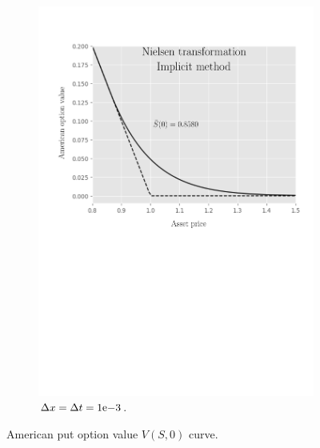 \begin{figure}[tbp]
\begin{subfigure}{0.4\textwidth}
    \includegraphics[width=\textwidth]{chapters/chapter3/TestCase3ImplictNielsen.pdf}
    \caption{$\Delta{x}=\Delta{t}={1}\mathrm{e}{-3}$.}
  \end{subfigure}
  \caption{American put option value $V(S, 0)$ curve.}
  \label{fig:finitedifferencesschemes:numericaresults:test_case_4}
\end{figure}

